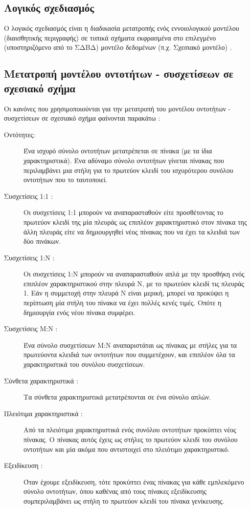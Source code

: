 \documentclass{assignment}
\begin{document}
\subsection{Λογικός σχεδιασμός}

Ο λογικός σχεδιασμός είναι η διαδικασία μετατροπής ενός εννοιολογικού μοντέλου (διαισθητικής περιγραφής) σε τυπικά σχήματα εκφρασμένα στο επιλεγμένο (υποστηριζόμενο από το ΣΔΒΔ) μοντέλο δεδομένων (π.χ. Σχεσιακό μοντέλο) \cite{class_notes}.

\subsection{Μετατροπή μοντέλου οντοτήτων - συσχετίσεων σε σχεσιακό σχή\-μα}

Οι κανόνες που χρησιμοποιούνται για την μετατροπή του μοντέλου οντοτήτων - συσχετίσεων σε σχεσιακό σχήμα φαίνονται παρακάτω \cite{class_notes}:

\begin{description}

  \item[Οντότητες:] Ένα ισχυρό σύνολο οντοτήτων μετατρέπεται σε πίνακα (με τα ίδια χαρακτηριστικά). Ένα αδύναμο σύνολο οντοτήτων γίνεται πίνακας που περιλαμβάνει μια στήλη για το πρωτεύον κλειδί του ισχυρότερου συνόλου οντοτήτων που το ταυτοποιεί. 
  \item[Συσχετίσεις 1:1 :] Οι συσχετίσεις 1:1 μπορούν να αναπαρασταθούν είτε προσθέτοντας το πρωτεύον κλειδί της μία πλευράς ως επιπλέον χαρακτηριστικό στον πίνακα της άλλη πλευράς είτε να δημιουργηθεί νέος πίνακας που να έχει τα κλειδιά των δύο πινάκων.
  \item[Συσχετίσεις 1:Ν :] Οι συσχετίσεις 1:Ν μπορούν να αναπαρασταθούν απλά με την προσθήκη ενός επιπλέον χαρακτηριστικού στην πλευρά Ν, με το πρωτεύον κλειδί τις πλευράς 1. Εάν η συμμετοχή στην πλευρά Ν είναι μερική, μπορεί να προκύψει η περίπτωση μία στήλη του πίνακα να έχει πολλές κενές τιμές. Οπότε η δημιουργία ενός νέου πίνακα συμφέρει.
  \item[Συσχετίσεις Μ:Ν :] Ένα σύνολο συσχετίσεων M:N αναπαριστάται ως πίνακας με στήλες για τα πρωτεύοντα κλειδιά των οντοτήτων που συμμετέχουν, και επιπλέον όλα τα χαρακτηριστικά του συνόλου συσχετίσεων. 
  \item[Σύνθετα χαρακτηριστικά :] Τα σύνθετα χαρακτηριστικά μετατρέπονται σε ένα σύνολο απλών.
  \item[Πλειότιμα χαρακτηριστικά :] Από τα πλειότιμα χαρακτηριστικά ενός συνόλου οντοτήτων προκύπτει νέος πίνακας. Ο πίνακας αυτός έχεις ως στήλες το πρωτεύον κλειδί του συνόλου οντοτήτων και μία ακόμα που αντιστοιχεί στο πλειότιμο χαρακτηριστικό.
  \item[Εξειδίκευση :] Όταν έχουμε εξειδίκευση, τότε προκύπτει ένας πίνακας για κάθε εμπλεκόμενο σύνολο οντοτήτων, όπου καθένας από τους πίνακες εξειδίκευσης συμπεριλαμβάνει ως στήλη το πρωτεύον κλειδί του πίνακα γενίκευσης.
 
\end{description}
\end{document}
